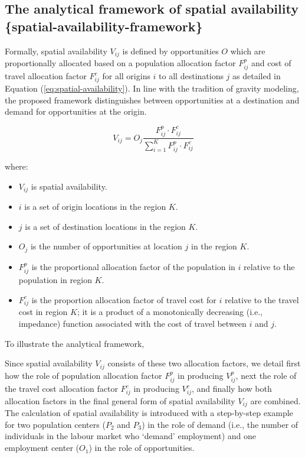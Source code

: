 \documentclass[]{elsarticle} %
\providecommand{\tightlist}{%
  \setlength{\itemsep}{0pt}\setlength{\parskip}{0pt}}
\begin{document}
\hypertarget{the-analytical-framework-of-spatial-availability-spatial-availability-framework}{%
\subsection{The analytical framework of spatial availability
\{spatial-availability-framework\}}\label{the-analytical-framework-of-spatial-availability-spatial-availability-framework}}

Formally, spatial availability \(V_{ij}\) is defined by opportunities
\(O\) which are proportionally allocated based on a population
allocation factor \(F^p_{ij}\) and cost of travel allocation factor
\(F^c_{ij}\) for all origins \(i\) to all destinations \(j\) as detailed
in Equation (\ref{eq:spatial-availability}). In line with the tradition
of gravity modeling, the proposed framework distinguishes between
opportunities at a destination and demand for opportunities at the
origin.

\begin{equation}
\label{eq:spatial-availability}
V_{ij} = O_j\frac{F^p_{ij} \cdot F^c_{ij}}{\sum_{i=1}^K F^p_{ij} \cdot F^c_{ij}}
\end{equation}

\noindent where:

\begin{itemize}
\tightlist
\item
  \(V_{ij}\) is spatial availability.
\item
  \(i\) is a set of origin locations in the region \(K\).
\item
  \(j\) is a set of destination locations in the region \(K\).
\item
  \(O_j\) is the number of opportunities at location \(j\) in the region
  \(K\).
\item
  \(F^p_{ij}\) is the proportional allocation factor of the population
  in \(i\) relative to the population in region \(K\).
\item
  \(F^c_{ij}\) is the proportion allocation factor of travel cost for
  \(i\) relative to the travel cost in region \(K\); it is a product of
  a monotonically decreasing (i.e., impedance) function associated with
  the cost of travel between \(i\) and \(j\).
\end{itemize}

To illustrate the analytical framework,

Since spatial availability \(V_{ij}\) consists of these two allocation
factors, we detail first how the role of population allocation factor
\(F^p_{ij}\) in producing \(V^p_{ij}\), next the role of the travel cost
allocation factor \(F^c_{ij}\) in producing \(V^c_{ij}\), and finally
how both allocation factors in the final general form of spatial
availability \(V_{ij}\) are combined. The calculation of spatial
availability is introduced with a step-by-step example for two
population centers (\(P_2\) and \(P_3\)) in the role of demand (i.e.,
the number of individuals in the labour market who `demand' employment)
and one employment center (\(O_1\)) in the role of opportunities.
\end{document}
